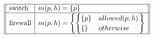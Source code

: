 \begin{table}
\[
\begin{array}{||l|l||}
\hline
\mbox{switch} & m(p, h) = \{p\}\\
\hline
\mbox{firewall} & m(p, h) = \left\{ \begin{cases}
                 \{p\} &  allowed(p, h) \\
                 \{\}   & otherwise \end{cases} \right\} \\
\hline
\end{array}
\]
\end{table}
